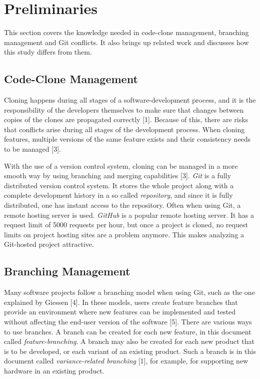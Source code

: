 \chapter{Preliminaries}
This section covers the knowledge needed in code-clone management, branching management and Git conflicts. It also brings up related work and discusses how this study differs from them.

\section{Code-Clone Management}
Cloning happens during all stages of a software-development process, and it is the responsibility of the developers themselves to make sure that changes between copies of the clones are propagated correctly [1]. Because of this, there are risks that conflicts arise during all stages of the development process. When cloning features, multiple versions of the same feature exists and their consistency needs to be managed [3].

With the use of a version control system, cloning can be managed in a more smooth way by using branching and merging capabilities [3]. \textit{Git} is a fully distributed version control system. It stores the whole project along with a complete development history in a so called \textit{repository}, and since it is fully distributed, one has instant access to the repository. Often when using Git, a remote hosting server is used. \textit{GitHub} is a popular remote hosting server. It has a request limit of 5000 requests per hour, but once a project is cloned, no request limits on project hosting sites are a problem anymore. This makes analyzing a Git-hosted project attractive.

\section{Branching Management}
Many software projects follow a branching model when using Git, such as the one explained by Giessen [4]. In these models, users create feature branches that provide an environment where new features can be implemented and tested without affecting the end-user version of the software [5]. There are various ways to use branches. A branch can be created for each new feature, in this document called \textit{feature-branching}. A branch may also be created for each new product that is to be developed, or each variant of an existing product. Such a branch is in this document called \textit{variance-related branching} [1], for example, for supporting new hardware in an existing product.

